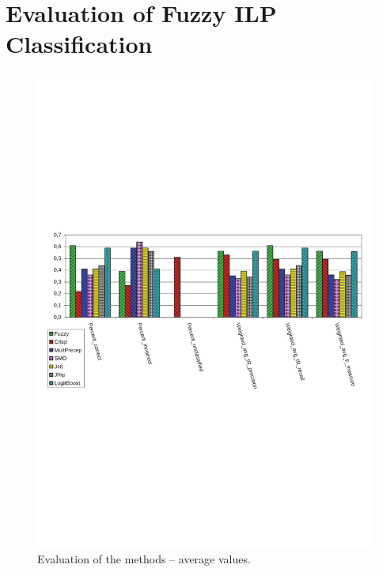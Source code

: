 \section{Evaluation of Fuzzy ILP Classification} \label{sec:fuzzy_eval}
\graphicspath{{../img/ch80/}}

\begin{figure}[p]
\centerline{\includegraphics[width=0.8\hsize]{2x10cross}}
\caption{Evaluation of the methods -- average values.}
\label{fig:graph2x10}
\end{figure}


